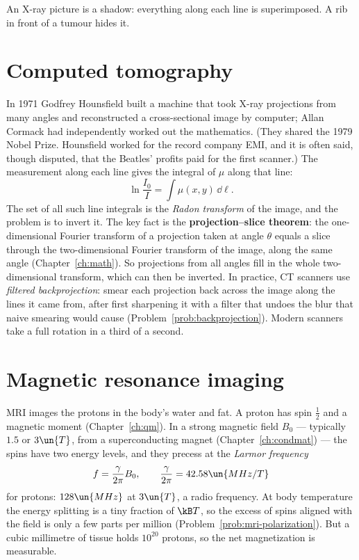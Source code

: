 An X-ray picture is a shadow: everything along each line is superimposed. A rib in front of a tumour hides it.

\section{Computed tomography}

In 1971 Godfrey Hounsfield built a machine that took X-ray projections from many angles and reconstructed a cross-sectional image by computer; Allan Cormack had independently worked out the mathematics. (They shared the 1979 Nobel Prize. Hounsfield worked for the record company EMI, and it is often said, though disputed, that the Beatles' profits paid for the first scanner.) The measurement along each line gives the integral of $\mu$ along that line:
\[
  \ln\frac{I_0}{I} = \int\mu(x,y)\,\dd\ell .
\]
The set of all such line integrals is the \emph{Radon transform} of the image, and the problem is to invert it. The key fact is the \textbf{projection--slice theorem}: the one-dimensional Fourier transform of a projection taken at angle $\theta$ equals a slice through the two-dimensional Fourier transform of the image, along the same angle (Chapter~\ref{ch:math}). So projections from all angles fill in the whole two-dimensional transform, which can then be inverted. In practice, CT scanners use \emph{filtered backprojection}: smear each projection back across the image along the lines it came from, after first sharpening it with a filter that undoes the blur that naive smearing would cause (Problem~\ref{prob:backprojection}). Modern scanners take a full rotation in a third of a second.

\section{Magnetic resonance imaging}

MRI images the protons in the body's water and fat. A proton has spin $\tfrac12$ and a magnetic moment (Chapter~\ref{ch:qm}). In a strong magnetic field $B_0$ --- typically $1.5$ or $3\un{T}$, from a superconducting magnet (Chapter~\ref{ch:condmat}) --- the spins have two energy levels, and they precess at the \emph{Larmor frequency}
\[
  f = \frac{\gamma}{2\pi}B_0,\qquad\frac{\gamma}{2\pi} = 42.58\un{MHz/T}
\]
for protons: $128\un{MHz}$ at $3\un{T}$, a radio frequency. At body temperature the energy splitting is a tiny fraction of $\kB T$, so the excess of spins aligned with the field is only a few parts per million (Problem~\ref{prob:mri-polarization}). But a cubic millimetre of tissue holds $10^{20}$ protons, so the net magnetization is measurable.


